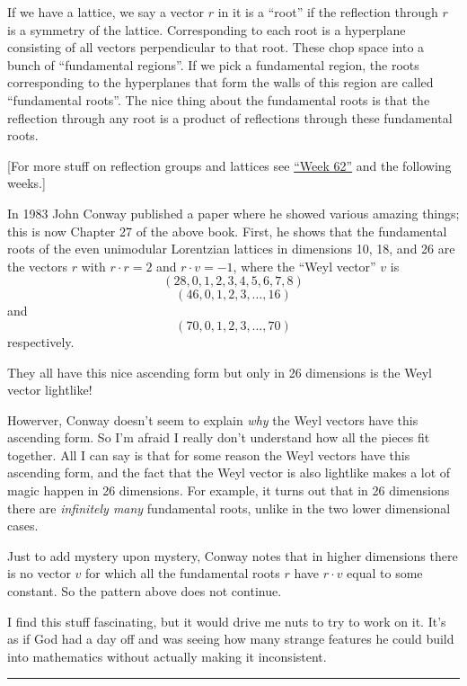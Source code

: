 \documentclass{article}
\begin{document}
If we have a lattice, we say a vector \(r\) in it is a ``root'' if the
reflection through \(r\) is a symmetry of the lattice. Corresponding to
each root is a hyperplane consisting of all vectors perpendicular to
that root. These chop space into a bunch of ``fundamental regions''. If
we pick a fundamental region, the roots corresponding to the hyperplanes
that form the walls of this region are called ``fundamental roots''. The
nice thing about the fundamental roots is that the reflection through
any root is a product of reflections through these fundamental roots.

{[}For more stuff on reflection groups and lattices see
\protect\hyperlink{week62}{``Week 62''} and the following weeks.{]}

In 1983 John Conway published a paper where he showed various amazing
things; this is now Chapter 27 of the above book. First, he shows that
the fundamental roots of the even unimodular Lorentzian lattices in
dimensions 10, 18, and 26 are the vectors \(r\) with \(r\cdot r = 2\)
and \(r\cdot v = -1\), where the ``Weyl vector'' \(v\) is
\[(28,0,1,2,3,4,5,6,7,8)\] \[(46,0,1,2,3,\ldots,16)\] and
\[(70,0,1,2,3,\ldots,70)\] respectively.

They all have this nice ascending form but only in 26 dimensions is the
Weyl vector lightlike!

Howerver, Conway doesn't seem to explain \emph{why} the Weyl vectors
have this ascending form. So I'm afraid I really don't understand how
all the pieces fit together. All I can say is that for some reason the
Weyl vectors have this ascending form, and the fact that the Weyl vector
is also lightlike makes a lot of magic happen in 26 dimensions. For
example, it turns out that in 26 dimensions there are \emph{infinitely
many} fundamental roots, unlike in the two lower dimensional cases.

Just to add mystery upon mystery, Conway notes that in higher dimensions
there is no vector \(v\) for which all the fundamental roots \(r\) have
\(r\cdot v\) equal to some constant. So the pattern above does not
continue.

I find this stuff fascinating, but it would drive me nuts to try to work
on it. It's as if God had a day off and was seeing how many strange
features he could build into mathematics without actually making it
inconsistent.

\begin{center}\rule{0.5\linewidth}{0.5pt}\end{center}
\end{document}
